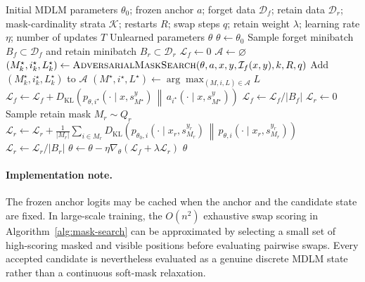 \documentclass[11pt]{article}
\newcommand{\Df}{\mathcal{D}_{f}}
\newcommand{\Dr}{\mathcal{D}_{r}}
\newcommand{\Iforget}{\mathcal{I}_{f}}
\newcommand{\KL}{D_{\mathrm{KL}}}
\begin{document}
\begin{algorithm}[t]
\caption{Adversarial Masked-Transition Unlearning (AMTU)}
\label{alg:amtu}
\begin{algorithmic}[1]
\Require Initial MDLM parameters $\theta_0$; frozen anchor $a$; forget data $\Df$;
         retain data $\Dr$; mask-cardinality strata $\mathcal{K}$; restarts $R$;
         swap steps $q$; retain weight $\lambda$; learning rate $\eta$;
         number of updates $T$
\Ensure Unlearned parameters $\theta$
\State $\theta\gets\theta_0$
    \State Sample forget minibatch $B_f\subset\Df$ and retain minibatch $B_r\subset\Dr$
    \State $\mathcal{L}_f\gets0$
        \State $\mathcal{A}\gets\varnothing$
            \State $(M_k^{\star},i_k^{\star},L_k^{\star})
            \gets \Call{AdversarialMaskSearch}{\theta,a,x,y,\Iforget(x,y),k,R,q}$
            \State Add $(M_k^{\star},i_k^{\star},L_k^{\star})$ to $\mathcal{A}$
        \EndFor
        \State $(M^{\star},i^{\star},L^{\star})
        \gets\displaystyle\arg\max_{(M,i,L)\in\mathcal{A}}L$
        \State $\mathcal{L}_f\gets\mathcal{L}_f+
        \KL\!\left(
            p_{\theta,i^{\star}}(\cdot\mid x,s_{M^{\star}}^y)
            \,\middle\|\,
            a_{i^{\star}}(\cdot\mid x,s_{M^{\star}}^y)
        \right)$
    \EndFor
    \State $\mathcal{L}_f\gets\mathcal{L}_f/|B_f|$
    \State $\mathcal{L}_r\gets0$
        \State Sample retain mask $M_r\sim Q_r$
        \State $\mathcal{L}_r\gets\mathcal{L}_r+
        \displaystyle\frac{1}{|M_r|}\sum_{i\in M_r}
        \KL\!\left(
            p_{\theta_0,i}(\cdot\mid x_r,s_{M_r}^{y_r})
            \,\middle\|\,
            p_{\theta,i}(\cdot\mid x_r,s_{M_r}^{y_r})
        \right)$
    \EndFor
    \State $\mathcal{L}_r\gets\mathcal{L}_r/|B_r|$
    \State $\theta\gets\theta-\eta\nabla_\theta\left(\mathcal{L}_f+\lambda\mathcal{L}_r\right)$
\EndFor
\State \Return $\theta$
\end{algorithmic}
\end{algorithm}

\paragraph{Implementation note.}
The frozen anchor logits may be cached when the anchor and the candidate state
are fixed.  In large-scale training, the $O(n^2)$ exhaustive swap scoring in
Algorithm~\ref{alg:mask-search} can be approximated by selecting a small set of
high-scoring masked and visible positions before evaluating pairwise swaps.
Every accepted candidate is nevertheless evaluated as a genuine discrete MDLM
state rather than a continuous soft-mask relaxation.
\end{document}
